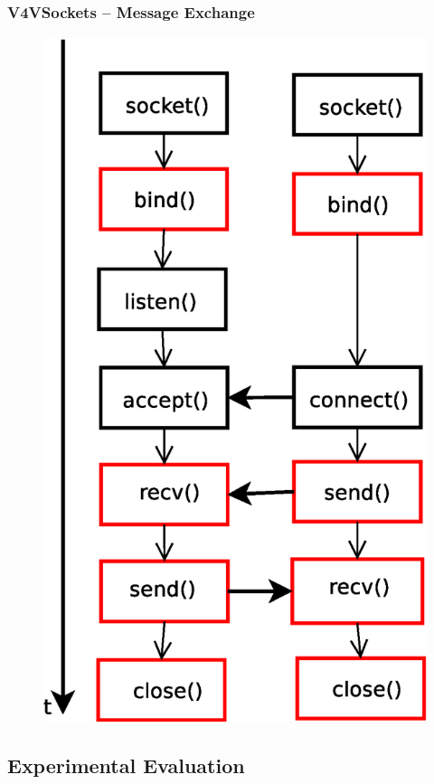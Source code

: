 \documentclass[red,slidestop,notes,compress,mathserif]{beamer}
\begin{document}
\begin{frame}
\frametitle{V4VSockets -- Message Exchange}
\begin{figure}
\includegraphics[scale=0.30]{figures/sockets.eps}
\end{figure}
\end{frame}

\subsection{Experimental Evaluation}
\end{document}
